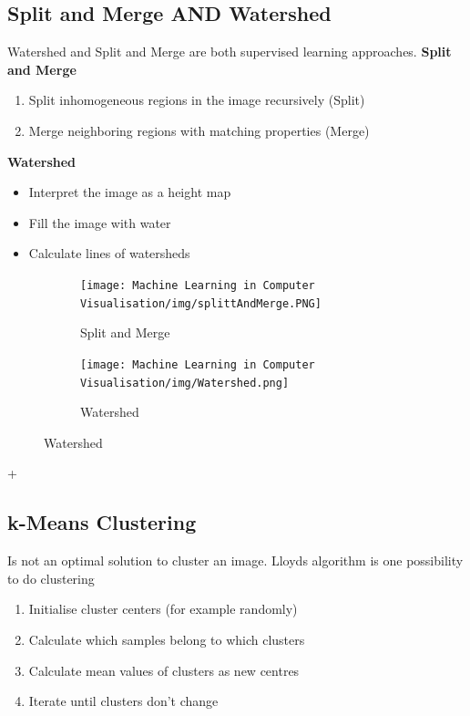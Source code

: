 \documentclass[x11names,11pt,a4paper]{article}
\theoremstyle{definition}
\begin{document}
\subsection{Split and Merge AND Watershed}
Watershed and Split and Merge are both supervised learning approaches. \newline
\textbf{Split and Merge}
\begin{enumerate}
    \item Split inhomogeneous regions in the image recursively (Split)
    \item Merge neighboring regions with matching properties (Merge)
\end{enumerate}

\textbf{Watershed}
\begin{itemize}
    \item Interpret the image as a height map
    \item Fill the image with water
    \item Calculate lines of watersheds
\end{itemize}

\begin{figure}[H]
     \centering
     \begin{subfigure}[b]{0.45\textwidth}
         \centering
         \texttt{[image: Machine Learning in Computer Visualisation/img/splittAndMerge.PNG]}
         \caption{Split and Merge}
     \end{subfigure}
     \hfill
     \begin{subfigure}[b]{0.45\textwidth}
         \centering
         \texttt{[image: Machine Learning in Computer Visualisation/img/Watershed.png]}
         \caption{Watershed}
     \end{subfigure}
\end{figure}

+\subsection{k-Means Clustering}
Is not an optimal solution to cluster an image. Lloyds algorithm is one possibility to do clustering
\begin{enumerate}
	\item[-\ ] Initialise cluster centers (for example randomly)
	\item Calculate which samples belong to which clusters
	\item Calculate mean values of clusters as new centres
	\item[-\ ] Iterate until clusters don't change
\end{enumerate}
\end{document}
